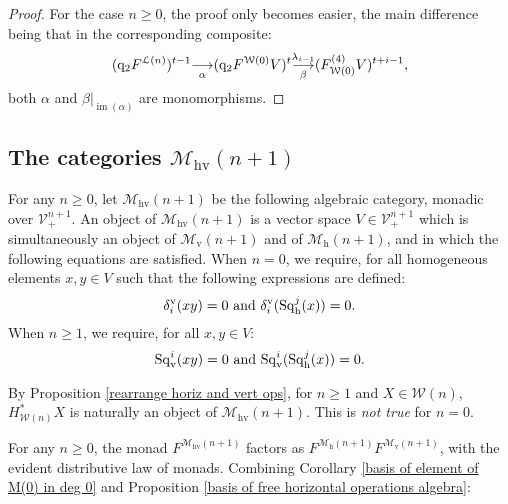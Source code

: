 \documentclass[11pt]{amsart} \renewcommand{\baselinestretch}{1.4}
\theoremstyle{plain}
\theoremstyle{definition}
\DeclareMathOperator{\im}{im}
\renewcommand{\to}{\longrightarrow}
\newcommand{\calV}{\mathcal{V}}
\newcommand{\calw}{\mathcal{W}}
\newcommand{\call}{\mathcal{L}}
\newcommand{\calMv}{\mathcal{M}\dver}
\newcommand{\calMh}{\mathcal{M}\dhor}
\newcommand{\calMhv}{\mathcal{M}_\mathrm{hv}}
\newcommand{\vect}[2]{\calV^{#1}_{#2}}
\newcommand{\quadgrad}[1]{\mathrm{q}_{#1}}
\newcommand{\mono}{{\to}}
\newcommand{\uver}{^\mathrm{v}}
\newcommand{\dver}{_\mathrm{v}}
\newcommand{\dhor}{_\mathrm{h}}
\newcommand{\Sqh}{\mathrm{Sq}\dhor}
\newcommand{\Sqv}{\mathrm{Sq}\dver}
\newcommand{\deltav}{\delta\uver}
\begin{document}
\begin{Cohomology Operations for W and U}
\begin{proof}
For the case $n\geq0$, the proof only becomes easier, the main difference being that in the corresponding composite:
\[(\quadgrad{2}F^{\call(n)})^{t-1}\underset{\smash{\alpha}}{{\to}} (\quadgrad{2}F^{\calw(0)}V)^{t}\underset{\smash{\beta}}{\overset{\lambda_{i-1}}{\mono}} (F^{(4)}_{\calw(0)}V)^{t+i-1},\]
both $\alpha$ and $\beta|_{\im(\alpha)}$ are monomorphisms.
\end{proof}

\subsection{The categories $\calMhv(n+1)$}
For any $n\geq0$, let $\calMhv(n+1)$ be the following algebraic category, monadic over $\vect{n+1}{+}$. An object of $\calMhv(n+1)$ is a vector space $V\in \vect{n+1}{+}$ which is simultaneously an object of $\calMv(n+1)$ and of $\calMh(n+1)$, and in which the following equations are satisfied. When $n=0$, we require, for all homogeneous elements $x,y\in V$ such that the following expressions are defined:
\[\deltav_i(xy)=0\textup{ and }\deltav_i(\Sqh^j(x))=0.\]
When $n\geq1$, we require, for all $x,y\in V$:
\[\Sqv^i(xy)=0\textup{ and }\Sqv^i(\Sqh^j(x))=0.\]

By Proposition \ref{rearrange horiz and vert ops}, for $n\geq1$ and $X\in\calw(n)$, $H^*_{\calw(n)}X$ is naturally an object of $\calMhv(n+1)$. This is \emph{not true} for $n=0$.

For any $n\geq0$, the monad $F^{\calMhv(n+1)}$ factors as $F^{\calMh(n+1)}F^{\calMv(n+1)}$, with the evident distributive law of monads. Combining Corollary \ref{basis of element of M(0) in deg 0} and Proposition \ref{basis of free horizontal operations algebra}:


\end{Cohomology Operations for W and U}
\end{document}
